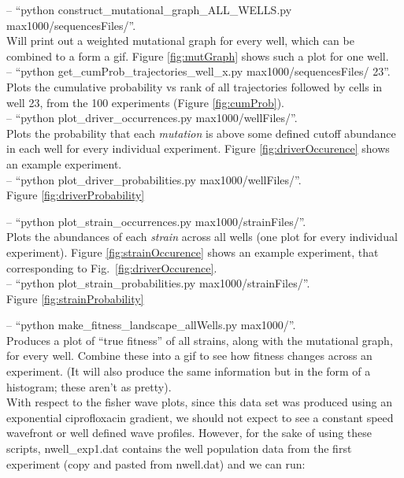 \documentclass[a4paper,10pt]{article}
\begin{document}
-- ``python construct\_mutational\_graph\_ALL\_WELLS.py max1000/sequencesFiles/''.\\
Will print out a weighted mutational graph for every well, which can be combined to a form a gif. Figure \ref{fig:mutGraph} shows such a plot for one well.\\

-- ``python get\_cumProb\_trajectories\_well\_x.py max1000/sequencesFiles/ 23''.\\
Plots the cumulative probability vs rank of all trajectories followed by cells in well 23, from the 100 experiments (Figure \ref{fig:cumProb}).\\

-- ``python plot\_driver\_occurrences.py max1000/wellFiles/''.\\
Plots the probability that each \emph{mutation} is above some defined cutoff abundance in each well for every individual experiment.
Figure \ref{fig:driverOccurence} shows an example experiment.\\

-- ``python plot\_driver\_probabilities.py max1000/wellFiles/''.\\
Figure \ref{fig:driverProbability}

-- ``python plot\_strain\_occurrences.py max1000/strainFiles/''.\\
Plots the abundances of each \emph{strain} across all wells (one plot for every individual experiment).
Figure \ref{fig:strainOccurence} shows an example experiment, that corresponding to Fig.~\ref{fig:driverOccurence}.\\

-- ``python plot\_strain\_probabilities.py max1000/strainFiles/''.\\
Figure \ref{fig:strainProbability}

-- ``python make\_fitness\_landscape\_allWells.py max1000/''.\\
Produces a plot of ``true fitness'' of all strains, along with the mutational graph, for every well. Combine these into a gif to see how fitness changes
across an experiment. (It will also produce the same information but in the form of a histogram; these aren't as pretty).\\

With respect to the fisher wave plots, since this data set was produced using an exponential ciprofloxacin gradient, we should not expect
to see a constant speed wavefront or well defined wave profiles. However, for the sake of using these scripts, nwell\_exp1.dat contains the
well population data from the first experiment (copy and pasted from nwell.dat) and we can run:\\
\end{document}

